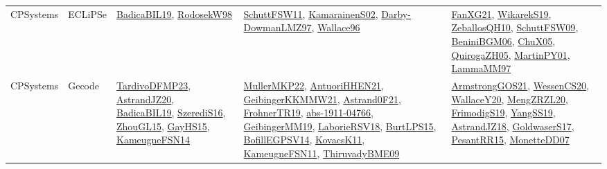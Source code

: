 {\begin{longtable}{lp{3cm}>{\raggedright}p{6cm}>{\raggedright}p{6cm}p{8cm}}
CPSystems & ECLiPSe & \href{papers/BadicaBIL19.pdf}{BadicaBIL19}\cite{BadicaBIL19}, \href{papers/RodosekW98.pdf}{RodosekW98}\cite{RodosekW98} & \href{articles/SchuttFSW11.pdf}{SchuttFSW11}\cite{SchuttFSW11}, \href{papers/KamarainenS02.pdf}{KamarainenS02}\cite{KamarainenS02}, \href{articles/Darby-DowmanLMZ97.pdf}{Darby-DowmanLMZ97}\cite{Darby-DowmanLMZ97}, \href{articles/Wallace96.pdf}{Wallace96}\cite{Wallace96} & \href{articles/FanXG21.pdf}{FanXG21}\cite{FanXG21}, \href{articles/WikarekS19.pdf}{WikarekS19}\cite{WikarekS19}, \href{articles/ZeballosQH10.pdf}{ZeballosQH10}\cite{ZeballosQH10}, \href{papers/SchuttFSW09.pdf}{SchuttFSW09}\cite{SchuttFSW09}, \href{papers/BeniniBGM06.pdf}{BeniniBGM06}\cite{BeniniBGM06}, \href{papers/ChuX05.pdf}{ChuX05}\cite{ChuX05}, \href{papers/QuirogaZH05.pdf}{QuirogaZH05}\cite{QuirogaZH05}, \href{articles/MartinPY01.pdf}{MartinPY01}\cite{MartinPY01}, \href{articles/LammaMM97.pdf}{LammaMM97}\cite{LammaMM97}\\
CPSystems & Gecode & \href{papers/TardivoDFMP23.pdf}{TardivoDFMP23}\cite{TardivoDFMP23}, \href{articles/AstrandJZ20.pdf}{AstrandJZ20}\cite{AstrandJZ20}, \href{papers/BadicaBIL19.pdf}{BadicaBIL19}\cite{BadicaBIL19}, \href{papers/SzerediS16.pdf}{SzerediS16}\cite{SzerediS16}, \href{papers/ZhouGL15.pdf}{ZhouGL15}\cite{ZhouGL15}, \href{papers/GayHS15.pdf}{GayHS15}\cite{GayHS15}, \href{articles/KameugneFSN14.pdf}{KameugneFSN14}\cite{KameugneFSN14} & \href{articles/MullerMKP22.pdf}{MullerMKP22}\cite{MullerMKP22}, \href{papers/AntuoriHHEN21.pdf}{AntuoriHHEN21}\cite{AntuoriHHEN21}, \href{papers/GeibingerKKMMW21.pdf}{GeibingerKKMMW21}\cite{GeibingerKKMMW21}, \href{papers/Astrand0F21.pdf}{Astrand0F21}\cite{Astrand0F21}, \href{papers/FrohnerTR19.pdf}{FrohnerTR19}\cite{FrohnerTR19}, \href{articles/abs-1911-04766.pdf}{abs-1911-04766}\cite{abs-1911-04766}, \href{papers/GeibingerMM19.pdf}{GeibingerMM19}\cite{GeibingerMM19}, \href{articles/LaborieRSV18.pdf}{LaborieRSV18}\cite{LaborieRSV18}, \href{papers/BurtLPS15.pdf}{BurtLPS15}\cite{BurtLPS15}, \href{papers/BofillEGPSV14.pdf}{BofillEGPSV14}\cite{BofillEGPSV14}, \href{articles/KovacsK11.pdf}{KovacsK11}\cite{KovacsK11}, \href{papers/KameugneFSN11.pdf}{KameugneFSN11}\cite{KameugneFSN11}, \href{papers/ThiruvadyBME09.pdf}{ThiruvadyBME09}\cite{ThiruvadyBME09} & \href{papers/ArmstrongGOS21.pdf}{ArmstrongGOS21}\cite{ArmstrongGOS21}, \href{papers/WessenCS20.pdf}{WessenCS20}\cite{WessenCS20}, \href{articles/WallaceY20.pdf}{WallaceY20}\cite{WallaceY20}, \href{articles/MengZRZL20.pdf}{MengZRZL20}\cite{MengZRZL20}, \href{papers/FrimodigS19.pdf}{FrimodigS19}\cite{FrimodigS19}, \href{papers/YangSS19.pdf}{YangSS19}\cite{YangSS19}, \href{papers/AstrandJZ18.pdf}{AstrandJZ18}\cite{AstrandJZ18}, \href{papers/GoldwaserS17.pdf}{GoldwaserS17}\cite{GoldwaserS17}, \href{papers/PesantRR15.pdf}{PesantRR15}\cite{PesantRR15}, \href{papers/MonetteDD07.pdf}{MonetteDD07}\cite{MonetteDD07}\\

\end{longtable}}
